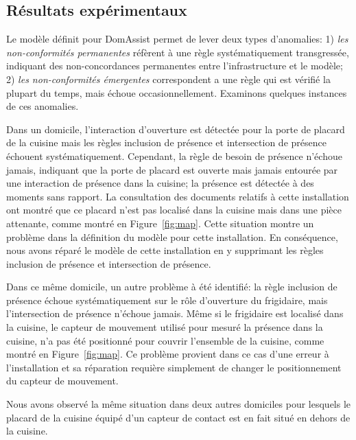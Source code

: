 \subsection{Résultats expérimentaux}\label{validation:results}



Le modèle définit pour DomAssist permet de lever deux types d'anomalies: 1) {\em les non-conformités permanentes} réfèrent à une règle systématiquement transgressée, indiquant des non-concordances permanentes entre l'infrastructure et le modèle; 2) {\em les non-conformités émergentes} correspondent a une règle qui est vérifié la plupart du temps, mais échoue occasionnellement. Examinons quelques instances de ces anomalies.

Dans un domicile, l'interaction d'ouverture est détectée pour la porte de placard de la cuisine mais les règles inclusion de présence et intersection de présence échouent systématiquement. Cependant, la règle de besoin de présence n'échoue jamais, indiquant que la porte de placard est ouverte mais jamais entourée par une interaction  de présence dans la cuisine; la présence est détectée à des moments sans rapport. La consultation des documents relatifs à cette installation ont montré que ce placard n'est pas localisé dans la cuisine mais dans une pièce attenante, comme montré en Figure~\ref{fig:map}. Cette situation montre un problème dans la définition du modèle pour cette installation. En conséquence, nous avons réparé le modèle de cette installation en y supprimant les règles inclusion de présence et intersection de présence.

Dans ce même domicile, un autre problème à été identifié: la règle inclusion de présence échoue systématiquement sur le rôle d'ouverture du frigidaire, mais l'intersection de présence n'échoue jamais. Même si le frigidaire est localisé dans la cuisine, le capteur de mouvement utilisé pour mesuré la présence dans la cuisine, n'a pas été positionné pour couvrir l'ensemble de la cuisine, comme montré en Figure~\ref{fig:map}. Ce problème provient dans ce cas d'une erreur à l'installation et sa réparation requière simplement de changer le positionnement du capteur de mouvement. %

Nous avons observé la même situation dans deux autres domiciles pour lesquels le placard de la cuisine équipé d'un capteur de contact est en fait situé en dehors de la cuisine.

